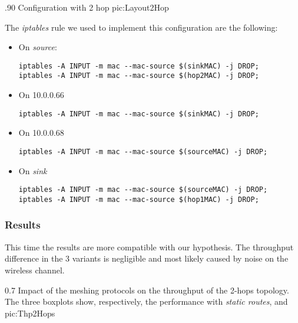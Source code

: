                 {.90\columnwidth}
                {Configuration with 2 hop}
                {pic:Layout2Hop}

         The \emph{iptables} rule we used to implement this
         configuration are the following:

         \begin{itemize}
         \item On \emph{source}:

        \begin{verbatim}
iptables -A INPUT -m mac --mac-source $(sinkMAC) -j DROP;
iptables -A INPUT -m mac --mac-source $(hop2MAC) -j DROP;
        \end{verbatim}

        \item On 10.0.0.66
        \begin{verbatim}
iptables -A INPUT -m mac --mac-source $(sinkMAC) -j DROP;
        \end{verbatim}

        \item On 10.0.0.68
        \begin{verbatim}
iptables -A INPUT -m mac --mac-source $(sourceMAC) -j DROP;
        \end{verbatim}

        \item On \emph{sink}
        \begin{verbatim}
iptables -A INPUT -m mac --mac-source $(sourceMAC) -j DROP;
iptables -A INPUT -m mac --mac-source $(hop1MAC) -j DROP;
        \end{verbatim}

        \end{itemize}

\subsubsection{Results}
        This time the results are more compatible with our
        hypothesis. The throughput difference in the 3 variants is
        negligible and most likely caused by noise on the wireless
        channel.

                {0.7 \columnwidth}
                {Impact of the meshing protocols on the throughput of the
                 2-hops topology. The three boxplots show, respectively,
                 the performance with \emph{static routes}, \emph{\batman}
                 and \emph{\olsr}}
                {pic:Thp2Hops}

